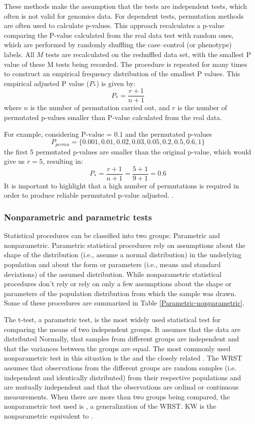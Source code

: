 These methods make the assumption that
the tests are independent tests, which often is not valid for genomics data.
For dependent tests, permutation methods are often used to calculate
 p-values.  This approach recalculates a p-value comparing
 the P-value calculated
 from the real data test with random ones,
 which are performed by randomly shuffling the case–control (or phenotype)
 labels. All $M$ tests are recalculated on the reshuffled data set, with the smallest P value of these M tests being recorded. The procedure is repeated for many times to construct an empirical frequency distribution of the smallest P values.
This  empirical adjusted P value ($P_{*}$) is given by: $$P_{*} = \frac{r + 1}{n + 1}$$ where $n$ is the number of
permutation carried out, and $r$ is the number of permutated p-values smaller than P-value calculated
from the real data.

For example, considering $\textrm{P-value = 0.1}$ and the
permutated p-values $$P_{permu} =\{0.001,0.01,0.02,0.03,0.05,0.2,0.5,0.6,1\}$$ the first 5 permutated p-values
are smaller than the original p-value, which would give us $r = 5$, resulting in:
$$P_{*} = \frac{r + 1}{n + 1} =  \frac{5 + 1}{9 + 1} = 0.6 $$
It is important to highlight that
a high number of permutations is required in order to produce reliable permutated p-value adjusted.
 \cite{davison1997bootstrap,north2002note,north2003note,sham2014statistical}.


\subsubsection{Nonparametric and parametric tests}

Statistical procedures can be classified into two groups:  Parametric and nonparametric.
Parametric statistical procedures rely on assumptions about the shape of the distribution
(i.e., assume a normal distribution) in the underlying population and about the form or
parameters (i.e., means and standard deviations) of the assumed distribution.
While nonparametric statistical procedures don't rely or rely on only a few assumptions about the shape or
parameters of the population distribution from which the sample was drawn.
Some of these procedures are summarized in Table \ref{Parametric-nonparametric}.

The t-test, a parametric test, is the most widely used statistical test for comparing the means of two independent groups.
It assumes that the data are distributed Normally, that samples from different groups are independent and that the variances between the groups are equal. The most commonly used nonparametric test in this situation is the  and the closely related . The WRST assumes that observations from the different groups are random samples (i.e. independent and identically distributed) from their respective populations and are mutually independent and that the observations are ordinal or continuous measurements.
When there are more than two groups being compared,
the nonparametric test used is , a generalization of the WRST. KW is the nonparametric equivalent to .


